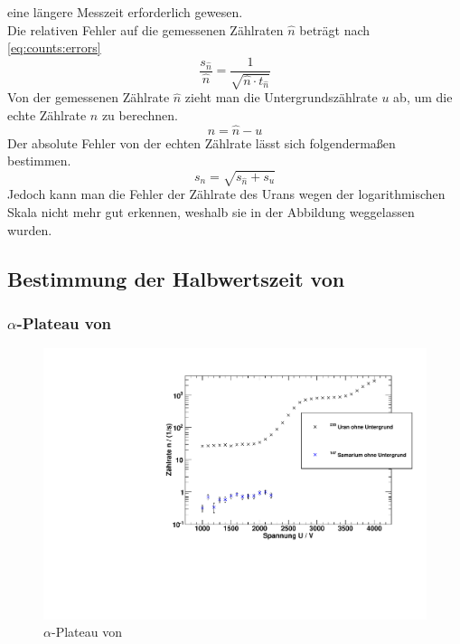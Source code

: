 eine längere Messzeit erforderlich gewesen. \\
Die relativen Fehler auf die gemessenen Zählraten $\hat{n}$ beträgt nach \autoref{eq:counts:errors}
\begin{equation}
  \frac{s_{\hat{n}}}{\hat{n}} = \frac{1}{\sqrt{\hat{n} \cdot t_{\hat{n}}}}
\end{equation}
Von der gemessenen Zählrate $\hat{n}$ zieht man die Untergrundszählrate $u$ ab, um die echte Zählrate $n$ zu berechnen.
\begin{equation}
  n = \hat{n} - u
\end{equation}
Der absolute Fehler von der echten Zählrate lässt sich folgendermaßen bestimmen.
\begin{equation}
  s_n = \sqrt{s_{\hat{n}} + s_u}
\end{equation}
Jedoch kann man die Fehler der Zählrate des Urans wegen der logarithmischen Skala nicht mehr gut erkennen, weshalb sie in der Abbildung 
weggelassen wurden.

\subsection{Bestimmung der Halbwertszeit von \samarium}
\subsubsection{$\alpha$-Plateau von \samarium}
\begin{figure}[H]
\begin{center}
  \includegraphics[width=15cm]{../img/Samarium147_Charakteristik.pdf}
  \caption[$\alpha$-Plateau mit \samarium]{$\alpha$-Plateau von \samarium} %
  \label{img:char:samarium}
\end{center}
\end{figure}

